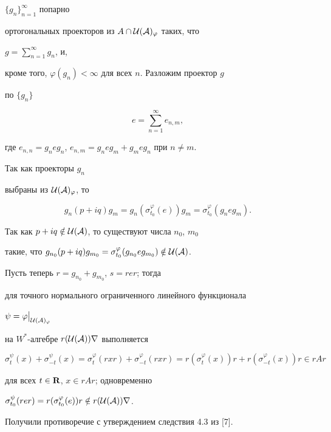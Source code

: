 \begin{pf}
$\{g_n\}^\infty_{n=1}$ попарно 


ортогональных проекторов из $A\cap\cal U(A)_\varphi$ таких, что 


$g=\sum\limits^\infty_{n=1}g_n$, и, 


кроме того, $\varphi(g_n)<\infty$ для всех $n$. Разложим проектор $g$ 


по $\{g_n\}$ 


$$ 


e=\sum^\infty_{n=1}e_{n,m}, 


$$ 


где $e_{n,n}=g_n e g_n$, $e_{n,m}=g_n e g_m+g_m e g_n$ при $n\ne m$. 


Так как проекторы $g_n$ 


выбраны из $\cal U(A)_\varphi$, то 


$$ 


g_n(p+i q)g_m=g_n(\sigma^\varphi_{t_0}(e))g_m= 


\sigma^\varphi_{t_0}(g_n e g_m). 


$$ 


Так как $p+i{}q\notin\cal U(A)$, то существуют числа $n_0$, $m_0$ 


такие, что $g_{n_0}(p+i{}q)g_{m_0}=\sigma^\varphi_{t_0}(g_{n_0}e 


g_{m_0})\notin\cal U(A)$. 


Пусть теперь $r=g_{n_0}+g_{m_0}$, $s=rer$; тогда 


для точного нормального ограниченного линейного функционала 


$\psi=\varphi\big|_{\cal U(A)_\varphi}$ 


на $W^*$-алгебре $r(\cal U(A))r$ выполняется 


$$ 


\sigma^\psi_t(x)+\sigma^\psi_{-t}(x)= 


\sigma^\varphi_t(r x r)+\sigma^\varphi_{-t}(r x r)= 


r(\sigma^\varphi_t(x))r+r(\sigma^\varphi_{-t}(x))r 


\in r A r 


$$ 


для всех $t\in\bold R$, $x\in r A r$; одновременно 


$\sigma^\psi_{t_0}(rer)=r(\sigma^\varphi_{t_0}(e))r\notin 


r(\cal U(A))r$. 


Получили противоречие с утверждением следствия 4.3 из [7]. 


\end{pf} 


